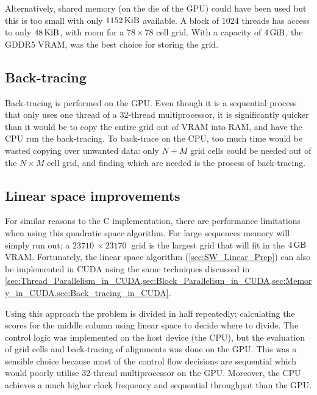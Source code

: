 Alternatively, shared memory (on the die of the GPU) could have been used but this is too small with only $\SI{1152}{\kibi\byte}$ available.
A block of $1024$ threads has access to only $\SI{48}{\kibi\byte}$, with room for a $78\times78$ cell grid.
With a capacity of $\SI{4}{\gibi\byte}$, the GDDR5 VRAM, was the best choice for storing the grid.

\subsection{Back-tracing}
\label{sec:Back_tracing_in_CUDA}

Back-tracing is performed on the GPU.
Even though it is a sequential process that only uses one thread of a $32$-thread multiprocessor, it is significantly quicker than it would be to copy the entire grid out of VRAM into RAM, and have the CPU run the back-tracing.
To back-trace on the CPU, too much time would be wasted copying over unwanted data: only $N+M$ grid cells could be needed out of the $N\times M$ cell grid, and finding which are needed is the process of back-tracing.

\subsection{Linear space improvements}
\label{sec:Linear_space_CUDA}

For similar reasons to the C implementation, there are performance limitations when using this quadratic space algorithm.
For large sequences memory will simply run out; a $\SI{23710}{} \times \SI{23170}{}$ grid is the largest grid that will fit in the $\SI{4}{\giga\byte}$ VRAM.
Fortunately, the linear space algorithm (\cref{sec:SW_Linear_Prep}) can also be implemented in CUDA using the same techniques discussed in \cref{sec:Thread_Parallelism_in_CUDA,sec:Block_Parallelism_in_CUDA,sec:Memory_in_CUDA,sec:Back_tracing_in_CUDA}.

Using this approach the problem is divided in half repeatedly; calculating the scores for the middle column using linear space to decide where to divide.
The control logic was implemented on the host device (the CPU), but the evaluation of grid cells and back-tracing of alignments was done on the GPU.
This was a sensible choice because most of the control flow decisions are sequential which would poorly utilise 32-thread multiprocessor on the GPU.
Moreover, the CPU achieves a much higher clock frequency and sequential throughput than the GPU.

